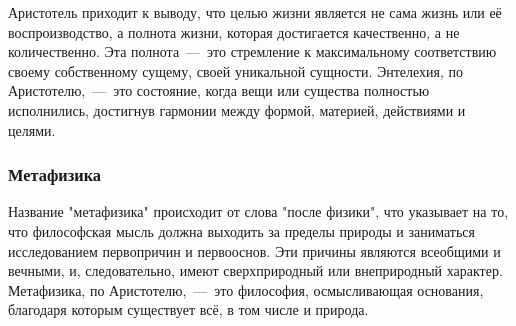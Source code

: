 
Аристотель приходит к выводу, что целью жизни является не сама жизнь или её воспроизводство, а полнота жизни, которая достигается качественно, а не количественно. Эта полнота~---~это стремление к максимальному соответствию своему собственному сущему, своей уникальной сущности. Энтелехия, по Аристотелю,~---~это состояние, когда вещи или существа полностью исполнились, достигнув гармонии между формой, материей, действиями и целями.

\subsubsection{Метафизика}

Название "метафизика" происходит от слова "после физики", что указывает на то, что философская мысль должна выходить за пределы природы и заниматься исследованием первопричин и первооснов. Эти причины являются всеобщими и вечными, и, следовательно, имеют сверхприродный или внеприродный характер. Метафизика, по Аристотелю,~---~это философия, осмысливающая основания, благодаря которым существует всё, в том числе и природа.


